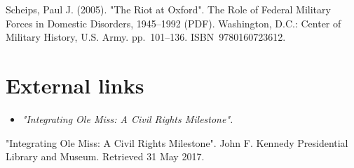 Scheips, Paul J. (2005). "The Riot at Oxford". The Role of Federal
Military Forces in Domestic Disorders, 1945--1992 (PDF). Washington,
D.C.: Center of Military History, U.S. Army. pp.~101--136.
ISBN~9780160723612.

\section{External links}\label{external-links}

\begin{itemize}
\item
  \emph{"Integrating Ole Miss: A Civil Rights Milestone".}
\end{itemize}

"Integrating Ole Miss: A Civil Rights Milestone". John F. Kennedy
Presidential Library and Museum. Retrieved 31 May 2017.
